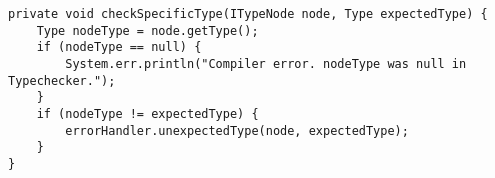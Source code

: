\begin{lstlisting}[caption={private function checkSpecificType in the type checker}, label={code:TC:checkSpecType}]
private void checkSpecificType(ITypeNode node, Type expectedType) {
    Type nodeType = node.getType();
    if (nodeType == null) {
        System.err.println("Compiler error. nodeType was null in Typechecker.");
    }
    if (nodeType != expectedType) {
        errorHandler.unexpectedType(node, expectedType);
    }
}
\end{lstlisting}